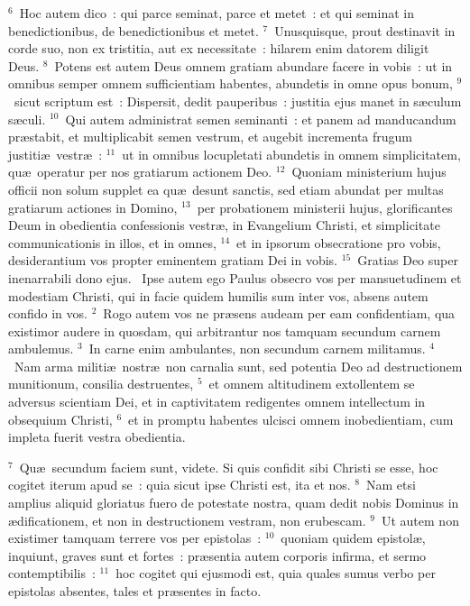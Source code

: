 ${}^{6}$~Hoc autem dico~: qui parce seminat, parce et metet~: et qui seminat in benedictionibus, de benedictionibus et metet.
${}^{7}$~Unusquisque, prout destinavit in corde suo, non ex tristitia, aut ex necessitate~: hilarem enim datorem diligit Deus.
${}^{8}$~Potens est autem Deus omnem gratiam abundare facere in vobis~: ut in omnibus semper omnem sufficientiam habentes, abundetis in omne opus bonum,
${}^{9}$~sicut scriptum est~: Dispersit, dedit pauperibus~: justitia ejus manet in s\ae culum s\ae culi.
${}^{10}$~Qui autem administrat semen seminanti~: et panem ad manducandum pr\ae stabit, et multiplicabit semen vestrum, et augebit incrementa frugum justiti\ae\ vestr\ae~:
${}^{11}$~ut in omnibus locupletati abundetis in omnem simplicitatem, qu\ae\ operatur per nos gratiarum actionem Deo.
${}^{12}$~Quoniam ministerium hujus officii non solum supplet ea qu\ae\ desunt sanctis, sed etiam abundat per multas gratiarum actiones in Domino,
${}^{13}$~per probationem ministerii hujus, glorificantes Deum in obedientia confessionis vestr\ae , in Evangelium Christi, et simplicitate communicationis in illos, et in omnes,
${}^{14}$~et in ipsorum obsecratione pro vobis, desiderantium vos propter eminentem gratiam Dei in vobis.
${}^{15}$~Gratias Deo super inenarrabili dono ejus.
~\lettrine[lines=10,image=true,loversize=0.05,lraise=-0.03]{I}{}pse autem ego Paulus obsecro vos per mansuetudinem et modestiam Christi, qui in facie quidem humilis sum inter vos, absens autem confido in vos.
${}^{2}$~Rogo autem vos ne pr\ae sens audeam per eam confidentiam, qua existimor audere in quosdam, qui arbitrantur nos tamquam secundum carnem ambulemus.
${}^{3}$~In carne enim ambulantes, non secundum carnem militamus.
${}^{4}$~Nam arma militi\ae\ nostr\ae\ non carnalia sunt, sed potentia Deo ad destructionem munitionum, consilia destruentes,
${}^{5}$~et omnem altitudinem extollentem se adversus scientiam Dei, et in captivitatem redigentes omnem intellectum in obsequium Christi,
${}^{6}$~et in promptu habentes ulcisci omnem inobedientiam, cum impleta fuerit vestra obedientia.


${}^{7}$~Qu\ae\ secundum faciem sunt, videte. Si quis confidit sibi Christi se esse, hoc cogitet iterum apud se~: quia sicut ipse Christi est, ita et nos.
${}^{8}$~Nam etsi amplius aliquid gloriatus fuero de potestate nostra, quam dedit nobis Dominus in \ae dificationem, et non in destructionem vestram, non erubescam.
${}^{9}$~Ut autem non existimer tamquam terrere vos per epistolas~:
${}^{10}$~quoniam quidem epistol\ae , inquiunt, graves sunt et fortes~: pr\ae sentia autem corporis infirma, et sermo contemptibilis~:
${}^{11}$~hoc cogitet qui ejusmodi est, quia quales sumus verbo per epistolas absentes, tales et pr\ae sentes in facto.


